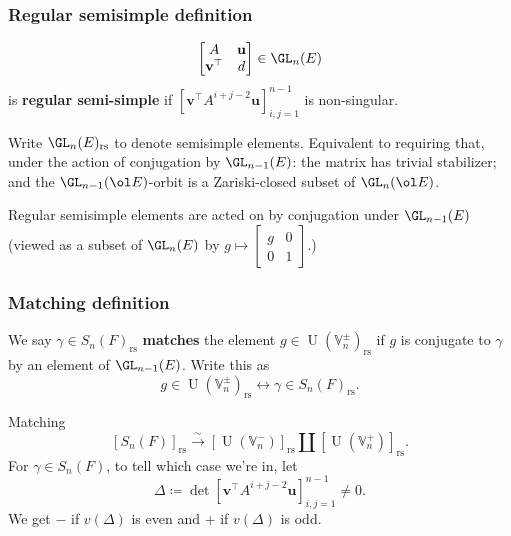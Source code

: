 \documentclass[11pt]{beamer}
\DeclareMathOperator{\U}{U}
\newcommand{\VV}{\mathbb{V}}
\newcommand{\rs}{_{\text{rs}}}
\newcommand{\uu}{\mathbf{u}}
\newcommand{\vv}{\mathbf{v}}
\begin{document}
\begin{frame}
  \frametitle{Regular semisimple definition}
  \[ \begin{bmatrix} A & \uu \\ \vv^\top & d \end{bmatrix} \in \GL_n(E) \]
  is \textbf{regular semi-simple} if
  $\left[ \vv^\top A^{i+j-2} \uu \right]_{i,j=1}^{n-1}$
  is non-singular.
  \begin{itemize}
    \ii Write $\GL_n(E)\rs$ to denote semisimple elements.
    \ii Equivalent to requiring that, under the action of conjugation by $\GL_{n-1}(E)$:
    the matrix has trivial stabilizer; and
    the $\GL_{n-1}(\ol E)$-orbit is a Zariski-closed subset of $\GL_n(\ol E)$.
  \end{itemize}
  Regular semisimple elements are acted on by conjugation under $\GL_{n-1}(E)$
  (viewed as a subset of $\GL_n(E)$ by $g \mapsto \begin{bmatrix} g & 0 \\ 0 & 1 \end{bmatrix}$.)
\end{frame}

\begin{frame}
  \frametitle{Matching definition}
  We say $\gamma \in S_n(F)\rs$ \textbf{matches} the element $g \in \U(\VV_n^\pm)\rs$
  if $g$ is conjugate to $\gamma$ by an element of $\GL_{n-1}(E)$.
  Write this as
  \[ g \in \U(\VV_n^\pm)\rs \longleftrightarrow \gamma \in S_n(F)\rs. \]
  \begin{block}{Matching}
    \[ [S_n(F)]\rs \xrightarrow{\sim} [\U(\VV_n^-)]\rs \amalg [\U(\VV_n^+)]\rs. \]
    For $\gamma \in S_n(F)$, to tell which case we're in, let
    \[ \Delta \coloneqq \det \left[ \vv^\top A^{i+j-2} \uu \right]_{i,j=1}^{n-1} \neq 0. \]
    We get $-$ if $v(\Delta)$ is even
    and $+$ if $v(\Delta)$ is odd.
  \end{block}
\end{frame}
\end{document}
